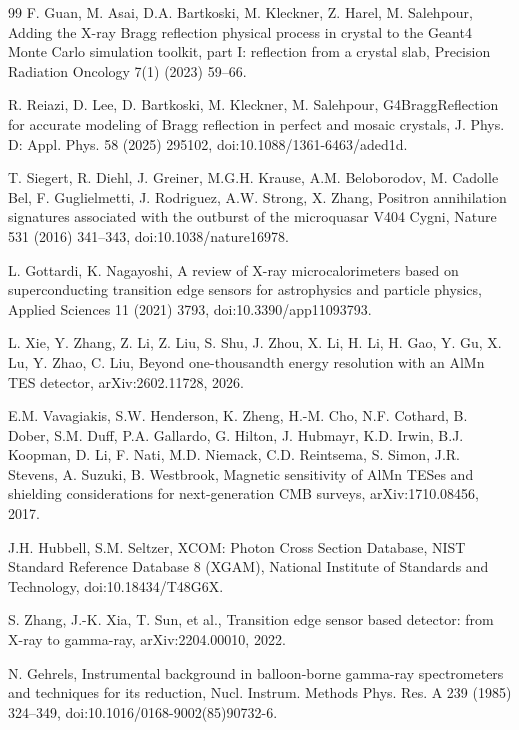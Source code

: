 \documentclass[11pt]{article}
\begin{document}
\begin{thebibliography}{99}
F. Guan, M. Asai, D.A. Bartkoski, M. Kleckner, Z. Harel, M. Salehpour, Adding the X-ray Bragg reflection physical process in crystal to the Geant4 Monte Carlo simulation toolkit, part I: reflection from a crystal slab, Precision Radiation Oncology 7(1) (2023) 59--66.

R. Reiazi, D. Lee, D. Bartkoski, M. Kleckner, M. Salehpour, G4BraggReflection for accurate modeling of Bragg reflection in perfect and mosaic crystals, J. Phys. D: Appl. Phys. 58 (2025) 295102, doi:10.1088/1361-6463/aded1d.

T. Siegert, R. Diehl, J. Greiner, M.G.H. Krause, A.M. Beloborodov, M. Cadolle Bel, F. Guglielmetti, J. Rodriguez, A.W. Strong, X. Zhang, Positron annihilation signatures associated with the outburst of the microquasar V404 Cygni, Nature 531 (2016) 341--343, doi:10.1038/nature16978.

L. Gottardi, K. Nagayoshi, A review of X-ray microcalorimeters based on superconducting transition edge sensors for astrophysics and particle physics, Applied Sciences 11 (2021) 3793, doi:10.3390/app11093793.

L. Xie, Y. Zhang, Z. Li, Z. Liu, S. Shu, J. Zhou, X. Li, H. Li, H. Gao, Y. Gu, X. Lu, Y. Zhao, C. Liu, Beyond one-thousandth energy resolution with an AlMn TES detector, arXiv:2602.11728, 2026.

E.M. Vavagiakis, S.W. Henderson, K. Zheng, H.-M. Cho, N.F. Cothard, B. Dober, S.M. Duff, P.A. Gallardo, G. Hilton, J. Hubmayr, K.D. Irwin, B.J. Koopman, D. Li, F. Nati, M.D. Niemack, C.D. Reintsema, S. Simon, J.R. Stevens, A. Suzuki, B. Westbrook, Magnetic sensitivity of AlMn TESes and shielding considerations for next-generation CMB surveys, arXiv:1710.08456, 2017.

J.H. Hubbell, S.M. Seltzer, XCOM: Photon Cross Section Database, NIST Standard Reference Database 8 (XGAM), National Institute of Standards and Technology, doi:10.18434/T48G6X.

S. Zhang, J.-K. Xia, T. Sun, et al., Transition edge sensor based detector: from X-ray to gamma-ray, arXiv:2204.00010, 2022.

N. Gehrels, Instrumental background in balloon-borne gamma-ray spectrometers and techniques for its reduction, Nucl. Instrum. Methods Phys. Res. A 239 (1985) 324--349, doi:10.1016/0168-9002(85)90732-6.


\end{thebibliography}
\end{document}

